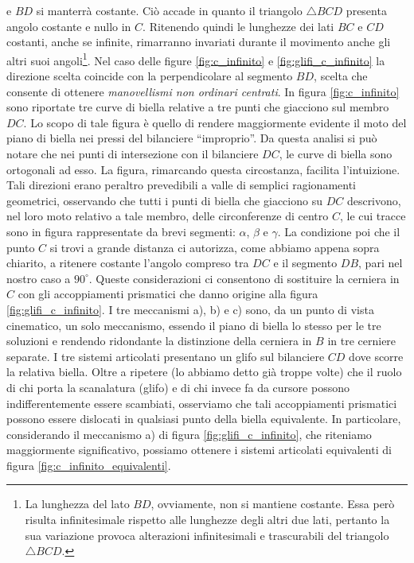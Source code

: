 e $BD$ si manterr\`a costante.
Ci\`o accade in quanto il triangolo $\triangle{BCD}$ presenta angolo costante
e nullo in $C$. Ritenendo quindi le lunghezze dei lati
$BC$ e $CD$ costanti, anche se infinite, rimarranno invariati durante
il movimento anche gli altri suoi angoli\footnote
{
La lunghezza del lato $BD$, ovviamente, non si mantiene costante. Essa
per\`o risulta infinitesimale rispetto alle lunghezze degli altri
due lati, pertanto la sua variazione provoca alterazioni infinitesimali
e trascurabili del triangolo $\triangle{BCD}$.
}.
Nel caso delle figure \ref{fig:c_infinito} e \ref{fig:glifi_c_infinito}
la direzione scelta coincide con la perpendicolare al segmento $BD$,
scelta che consente di ottenere {\em manovellismi non ordinari
centrati}.
\noindent In figura \ref{fig:c_infinito} sono riportate tre curve di biella
relative a tre punti che giacciono sul membro $DC$.
Lo scopo di tale figura \`e quello 
di rendere maggiormente evidente il moto del piano di
biella nei pressi del bilanciere  ``improprio''.
Da questa analisi si pu\`o notare che nei punti di intersezione con 
il bilanciere $DC$, le curve di biella sono 
ortogonali ad esso. La figura, rimarcando questa circostanza, facilita
l'intuizione. Tali direzioni
erano peraltro prevedibili a valle di semplici ragionamenti geometrici, osservando che 
tutti i punti di biella che giacciono su $DC$ descrivono, nel loro
moto relativo a tale membro,  delle circonferenze di centro $C$,
le cui tracce sono in figura rappresentate da brevi segmenti:
$\alpha$, $\beta$ e $\gamma$.
La condizione poi che il punto $C$ si trovi a grande distanza ci
autorizza, come abbiamo appena sopra chiarito, a ritenere costante
l'angolo compreso tra $DC$ e il segmento $DB$,
pari nel nostro caso a $90^{\circ}$. 
Queste considerazioni ci consentono di sostituire la cerniera in $C$ con
gli accoppiamenti prismatici che danno origine alla figura
\ref{fig:glifi_c_infinito}.
\noindent I tre meccanismi a), b) e c) sono, da un punto
di vista cinematico, un solo meccanismo, essendo il piano di biella lo stesso
per le tre soluzioni e rendendo ridondante la distinzione della cerniera
in $B$ in tre cerniere separate.
I tre sistemi articolati   
presentano un glifo sul bilanciere $CD$ dove scorre la relativa biella.
Oltre a ripetere (lo abbiamo detto gi\`a troppe volte) che il ruolo
di chi porta la
scanalatura (glifo) e di chi invece fa da cursore possono indifferentemente
essere scambiati, osserviamo che tali
accoppiamenti prismatici possono essere dislocati in qualsiasi punto della
biella equivalente. 
\noindent In particolare, considerando il meccanismo a) di figura \ref{fig:glifi_c_infinito}, che riteniamo maggiormente significativo,
possiamo ottenere i sistemi articolati equivalenti
 di figura \ref{fig:c_infinito_equivalenti}.

